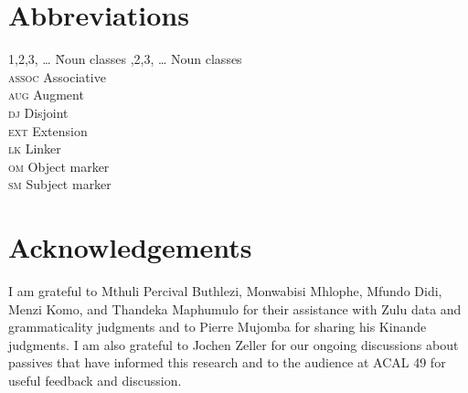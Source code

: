 \documentclass[output=paper,colorlinks,citecolor=brown]{langscibook}
\begin{document}
\section*{Abbreviations}
\begin{multicols}{3}
\begin{tabbing}
    1,2,3, \ldots \hspace{1ex} \= Noun classes ,2,3, \ldots \> Noun classes \\
		\textsc{assoc} \> Associative \\
		\textsc{aug} \> Augment \\
		\textsc{dj} \> Disjoint\\
		\textsc{ext} \> Extension \\
		\textsc{lk} \> Linker \\
		\textsc{om} \> Object marker \\
		\textsc{sm} \> Subject marker
\end{tabbing}
\end{multicols}

\section*{Acknowledgements}

I am grateful to Mthuli Percival Buthlezi, Monwabisi Mhlophe, Mfundo Didi, Menzi Komo, and Thandeka Maphumulo  for their assistance with Zulu data and grammaticality judgments and to Pierre Mujomba for sharing his Kinande judgments. I am also grateful to Jochen Zeller for our ongoing discussions about passives that have informed this research and to the audience at ACAL 49 for useful feedback and discussion.

{\sloppy\printbibliography[heading=subbibliography,notkeyword=this]}
\end{document}
